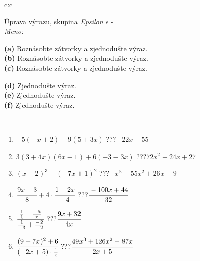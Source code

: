 \documentclass[10pt]{report}
\begin{document}
\newpage
\thispagestyle{empty}
\begin{tabular}{c:c}
\begin{minipage}[c][104.5mm][t]{0.5\linewidth}
\begin{center}
\vspace{7mm}
{\huge Úprava výrazu, skupina \textit{Epsilon $\epsilon$} -}\\[5mm]
\textit{Meno:}\phantom{xxxxxxxxxxxxxxxxxxxxxxxxxxxxxxxxxxxxxxxxxxxxxxxxxxxxxxxxxxxxxxxxx}\\[5mm]
\begin{minipage}{0.95\linewidth}
\begin{center}
{\small \begin{minipage}{0.6\textwidth}
\textbf{(a)} Roznásobte zátvorky a zjednodušte výraz. \\[1mm]
\textbf{(b)} Roznásobte zátvorky a zjednodušte výraz. \\[1mm]
\textbf{(c)} Roznásobte zátvorky a zjednodušte výraz.
\end{minipage} \begin{minipage}{0.39\textwidth}
\textbf{(d)} Zjednodušte výraz. \\[1mm]
\textbf{(e)} Zjednodušte výraz. \\[1mm]
\textbf{(f)} Zjednodušte výraz.
\end{minipage}
}
\end{center}
\end{minipage}
\\[4mm]
\begin{minipage}{0.79\linewidth}
\begin{center}
\begin{varwidth}{\linewidth}
\begin{enumerate}
\normalsize
\item $-5(-x+2)-9(5+3x)$\quad \dotfill\; ???\;\dotfill \quad $-22x-55$
\item $3(3+4x)(6x-1)+6(-3-3x)$\quad \dotfill\; ???\;\dotfill \quad $72x^2-24x+27$
\item $(x-2)^3-(-7x+1)^2$\quad \dotfill\; ???\;\dotfill \quad $-x^3-55x^2+26x-9$
\item $\cfrac{9x-3}{8}+4\cdot\cfrac{1-2x}{-4}$\quad \dotfill\; ???\;\dotfill \quad $\cfrac{-100x+44}{32}$
\item $\cfrac{\frac{1}{1}-\frac{-5}{x}}{\frac{1}{-3}+\frac{-2}{-2}}$\quad \dotfill\; ???\;\dotfill \quad $\cfrac{9x+32}{4x}$
\item $\cfrac{(9+7x)^2+6}{(-2x+5)\cdot\frac{1}{x}}$\quad \dotfill\; ???\;\dotfill \quad $\cfrac{49x^3+126x^2-87x}{2x+5}$

\end{enumerate}
\end{varwidth}
\end{center}
\end{minipage}
\end{center}
\end{minipage}
\end{tabular}
\end{document}
